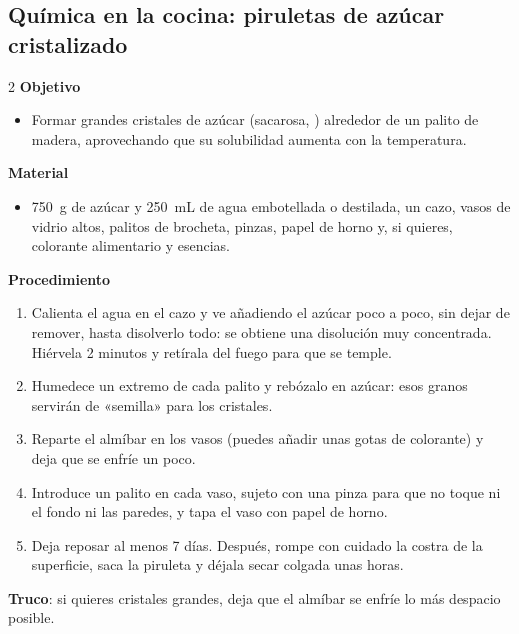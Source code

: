 \subsection{Química en la cocina: piruletas de azúcar cristalizado}

\begin{multicols}{2}
    \textbf{Objetivo}
    \begin{itemize}
        \item Formar grandes cristales de azúcar (sacarosa, ) alrededor de un palito de madera, aprovechando que su
        solubilidad aumenta con la temperatura.
    \end{itemize}
    \columnbreak
    \textbf{Material}
    \begin{itemize}
        \item \qty{750}{\gram} de azúcar y \qty{250}{\mL} de agua embotellada o destilada, un cazo, vasos de vidrio altos,
        palitos de brocheta, pinzas, papel de horno y, si quieres, colorante alimentario y esencias.
    \end{itemize}
\end{multicols}

\textbf{Procedimiento}
\begin{enumerate}[label=\numberballgreen]
    \item Calienta el agua en el cazo y ve añadiendo el azúcar poco a poco, sin dejar de remover, hasta disolverlo todo: se
    obtiene una disolución muy concentrada. Hiérvela 2 minutos y retírala del fuego para que se temple.
    \item Humedece un extremo de cada palito y rebózalo en azúcar: esos granos servirán de «semilla» para los cristales.
    \item Reparte el almíbar en los vasos (puedes añadir unas gotas de colorante) y deja que se enfríe un poco.
    \item Introduce un palito en cada vaso, sujeto con una pinza para que no toque ni el fondo ni las paredes, y tapa el vaso con
    papel de horno.
    \item Deja reposar al menos 7 días. Después, rompe con cuidado la costra de la superficie, saca la piruleta y déjala secar
    colgada unas horas.
\end{enumerate}
\textbf{Truco}: si quieres cristales grandes, deja que el almíbar se enfríe lo más despacio posible.

